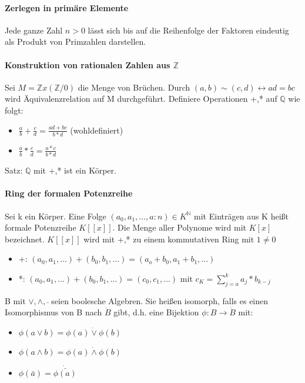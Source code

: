 \documentclass[10pt,landscape]{article}
\begin{document}
\begin{multicols}{3}
\paragraph{Zerlegen in primäre Elemente}
Jede ganze Zahl $n>0$ lässt sich bis auf die Reihenfolge der Faktoren eindeutig als Produkt von Primzahlen darstellen.

\paragraph{Konstruktion von rationalen Zahlen aus $\mathbb{Z}$}
Sei $M=\mathbb{Z} x(\mathbb{Z} /{0})$ die Menge von Brüchen. Durch $(a,b)\sim (c,d)\leftrightarrow ad=bc$ wird Äquivalenzrelation auf M durchgeführt. Definiere Operationen +,* auf $\mathbb{Q}$ wie folgt:
\begin{itemize}
    \item $\frac{a}{b}+\frac{c}{d} = \frac{ad+bc}{b*d}$ (wohldefiniert)
    \item $\frac{a}{b}*\frac{c}{d} = \frac{a*c}{b*d}$
\end{itemize}
Satz: $\mathbb{Q}$ mit +,* ist ein Körper.

\paragraph{Ring der formalen Potenzreihe}
Sei k ein Körper. Eine Folge $(a_0, a_1,...,a:n)\in K^{\mathbb{N}}$ mit Einträgen aus K heißt formale Potenzreihe $K[[x]]$. Die Menge aller Polynome wird mit $K[x]$ bezeichnet. $K[[x]]$ wird mit +,* zu einem kommutativen Ring mit $1\not=0$
\begin{itemize}
    \item +: $(a_0,a_1,...) + (b_0,b_1,...) = (a_o+b_0, a_1+b_1, ...)$
    \item *: $(a_0,a_1,...) + (b_0,b_1,...) = (c_0, c_1,...)$ mit $c_K=\sum_{j=a}^{k} a_j*b_{k-j}$
\end{itemize}


B mit $\vee, \wedge, \bar{ }$ seien boolesche Algebren. Sie heißen isomorph, falls es einen Isomorphismus von B nach $\dot{B}$ gibt, d.h. eine Bijektion $\phi: B \rightarrow \dot{B}$ mit:
\begin{itemize}
    \item $\phi(a\vee b) =\phi(a)\dot{\vee}\phi(b)$
    \item $\phi(a\wedge b)=\phi(a)\dot{\wedge}\phi(b)$
    \item $\phi(\bar{a}) = \dot{\bar{\phi(a)}}$
\end{itemize}


\end{multicols}
\end{document}
